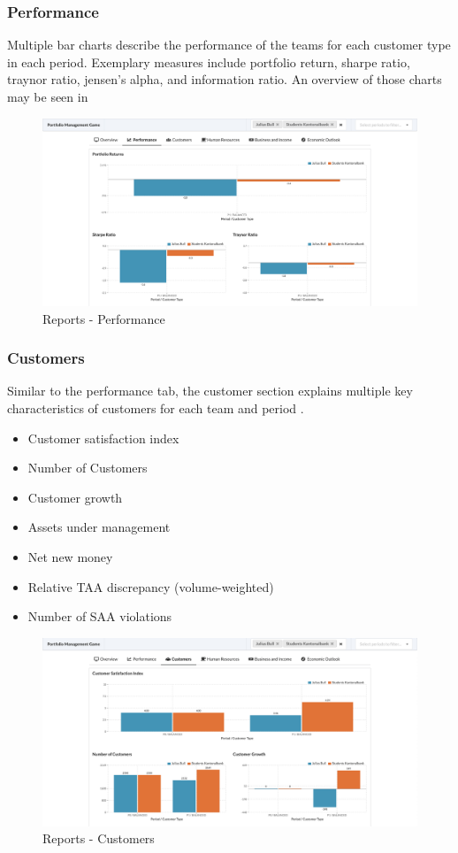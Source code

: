 \subsubsection{Performance}
Multiple bar charts describe the performance of the teams for each customer type in each period. Exemplary measures include portfolio return, sharpe ratio, traynor ratio, jensen's alpha, and information ratio. An overview of those charts may be seen in 
\begin{figure}[h!]
  \centering
  \includegraphics[scale=0.2]{img/application-overview/reports/02_performance.png}
  \caption{Reports - Performance}
  \label{fig:reports_performance}
\end{figure}

\subsubsection{Customers}
Similar to the performance tab, the customer section explains multiple key characteristics of customers for each team and period .
\begin{itemize}
  \setlength\itemsep{0.01em}
  \item Customer satisfaction index
  \item Number of Customers
  \item Customer growth
  \item Assets under management
  \item Net new money
  \item Relative TAA discrepancy (volume-weighted)
  \item Number of SAA violations
\end{itemize}
\begin{figure}[h!]
  \centering
  \includegraphics[scale=0.2]{img/application-overview/reports/03_customers.png}
  \caption{Reports - Customers}
  \label{fig:reports_customers}
\end{figure}

